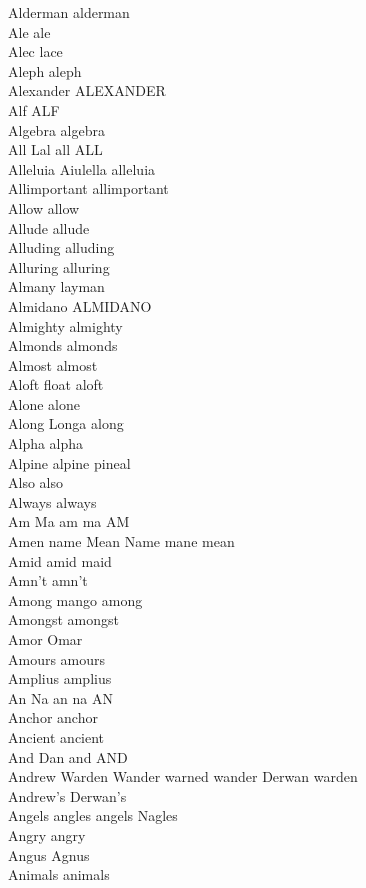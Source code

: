 Alderman alderman\\
Ale ale\\
Alec lace\\
Aleph aleph\\
Alexander ALEXANDER\\
Alf ALF\\
Algebra algebra\\
All Lal all ALL\\
Alleluia Aiulella alleluia\\
Allimportant allimportant\\
Allow allow\\
Allude allude\\
Alluding alluding\\
Alluring alluring\\
Almany layman\\
Almidano ALMIDANO\\
Almighty almighty\\
Almonds almonds\\
Almost almost\\
Aloft float aloft\\
Alone alone\\
Along Longa along\\
Alpha alpha\\
Alpine alpine pineal\\
Also also\\
Always always\\
Am Ma am ma AM\\
Amen name Mean Name mane mean\\
Amid amid maid\\
Amn't amn't\\
Among mango among\\
Amongst amongst\\
Amor Omar\\
Amours amours\\
Amplius amplius\\
An Na an na AN\\
Anchor anchor\\
Ancient ancient\\
And Dan and AND\\
Andrew Warden Wander warned wander Derwan warden\\
Andrew's Derwan's\\
Angels angles angels Nagles\\
Angry angry\\
Angus Agnus\\
Animals animals\\
